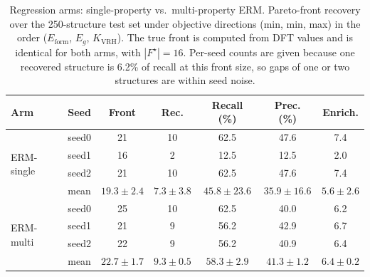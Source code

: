 \begin{table}[htbp]
\renewcommand{\arraystretch}{1.2}
\setlength{\tabcolsep}{4pt}
\caption{Regression arms: single-property vs.\ multi-property ERM. Pareto-front recovery over the 250-structure test set under objective directions (min, min, max) in the order ($E_\mathrm{form}$, $E_g$, $K_\mathrm{VRH}$). The true front is computed from DFT values and is identical for both arms, with $|F^\star|{=}16$. Per-seed counts are given because one recovered structure is 6.2\% of recall at this front size, so gaps of one or two structures are within seed noise.}
\label{tab:pareto_arms_erm}
\centering
\footnotesize
\begin{tabular}{@{}llccccc@{}}
\hline\hline
\textbf{Arm} & \textbf{Seed} & \textbf{Front} & \textbf{Rec.} & \textbf{Recall (\%)} & \textbf{Prec. (\%)} & \textbf{Enrich.} \\
\hline
\multirow{4}{*}{ERM-single}
  & seed0 & 21 & 10 & 62.5 & 47.6 & 7.4 \\
  & seed1 & 16 & 2 & 12.5 & 12.5 & 2.0 \\
  & seed2 & 21 & 10 & 62.5 & 47.6 & 7.4 \\
  & mean & $19.3 \pm 2.4$ & $7.3 \pm 3.8$ & $45.8 \pm 23.6$ & $35.9 \pm 16.6$ & $5.6 \pm 2.6$ \\
\hline
\multirow{4}{*}{ERM-multi}
  & seed0 & 25 & 10 & 62.5 & 40.0 & 6.2 \\
  & seed1 & 21 & 9 & 56.2 & 42.9 & 6.7 \\
  & seed2 & 22 & 9 & 56.2 & 40.9 & 6.4 \\
  & mean & $22.7 \pm 1.7$ & $9.3 \pm 0.5$ & $58.3 \pm 2.9$ & $41.3 \pm 1.2$ & $6.4 \pm 0.2$ \\
\hline\hline
\end{tabular}
\end{table}
